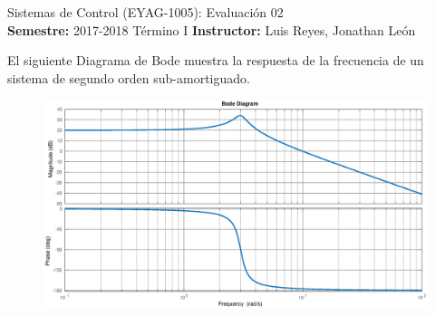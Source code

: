 \documentclass[ a4paper, twoside, 11pt]{article}
\newcommand{\numero}{02}
\begin{document}
\allowdisplaybreaks

\begin{center}
\Large Sistemas de Control (EYAG-1005): Evaluaci\'on \numero \\[1ex]
\small \textbf{Semestre:} 2017-2018 T\'ermino I \qquad
\textbf{Instructor:} Luis Reyes, Jonathan Le\'on
\end{center}
\halfskip



\begin{problem} El siguiente Diagrama de Bode muestra la respuesta de la frecuencia de un sistema de segundo orden sub-amortiguado. 

\begin{figure}[htb]
\centering
\includegraphics[width=\textwidth]{prob_bode-identificacion.eps}
\end{figure}


\end{problem}
\end{document}
